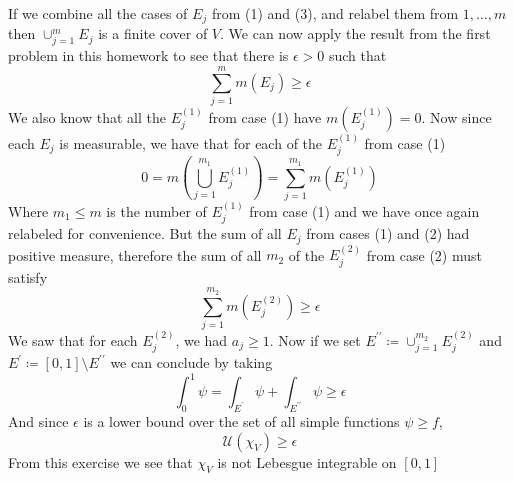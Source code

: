 \documentclass[11pt]{article}
\newcommand{\pr}{^{\prime}}
\newcommand{\dpr}{^{\prime\prime}}
\begin{document}
    If we combine all the cases of $E_j$ from (1) and (3), and relabel them from $1,\hdots,m$ then $\cup_{j=1}^{m} E_j$ is a finite cover of $V$.
    We can now apply the result from the first problem in this homework to see that there is $\epsilon > 0$ such that
    \[
        \sum_{j=1}^{m} m(E_j) \geq \epsilon
    \]
    We also know that all the $E_j^{(1)}$ from case (1) have $m(E_j^{(1)}) = 0$.
    Now since each $E_j$ is measurable, we have that for each of the $E^{(1)}_j$ from case (1)
    \[
        0 = m\left( \bigcup_{j=1}^{m_1} E^{(1)}_j \right) = \sum_{j=1}^{m_1} m(E^{(1)}_j)
    \]
    Where $m_1 \leq m$ is the number of $E^{(1)}_j$ from case (1) and we have once again relabeled for convenience.
    But the sum of all $E_j$ from cases (1) and (2) had positive measure, therefore the sum of all $m_2$ of the $E^{(2)}_j$ from case (2) must satisfy
    \[
        \sum_{j=1}^{m_2} m(E^{(2)}_j) \geq \epsilon
    \]
    We saw that for each $E_j^{(2)}$, we had $a_j \geq 1$.
    Now if we set $E \dpr \coloneqq \cup_{j=1}^{m_2} E_j^{(2)}$ and $E\pr \coloneqq [0,1] \setminus E \dpr$ we can conclude by taking
    \[
        \int_{0}^{1} \psi = \int_{E\pr} \psi + \int_{E\dpr} \psi \geq \epsilon
    \]
    And since $\epsilon$ is a lower bound over the set of all simple functions $\psi \geq f$,
    \[
        \mathcal{U}(\chi_V) \geq \epsilon
    \]
    From this exercise we see that $\chi_V$ is not Lebesgue integrable on $[0,1]$
\end{document}
